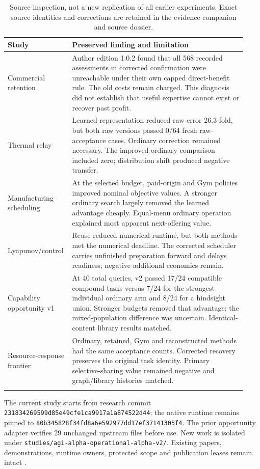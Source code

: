 \documentclass[11pt,letterpaper]{article}
\begin{document}
\begin{longtable}{@{}p{0.22\linewidth}p{0.71\linewidth}@{}}
\toprule Study & Preserved finding and limitation \\ \midrule\endhead
Commercial retention & Author edition 1.0.2 found that all 568 recorded assessments in corrected confirmation were unreachable under their own capped direct-benefit rule. The old costs remain charged. This diagnosis did not establish that useful expertise cannot exist or recover past profit. \\ 
Thermal relay & Learned representation reduced raw error 26.3-fold, but both raw versions passed 0/64 fresh raw-acceptance cases. Ordinary correction remained necessary. The improved ordinary comparison included zero; distribution shift produced negative transfer. \\
Manufacturing scheduling & At the selected budget, paid-origin and Gym policies improved nominal objective values. A stronger ordinary search largely removed the learned advantage cheaply. Equal-menu ordinary operation explained most apparent next-offering value. \\
Lyapunov/control & Reuse reduced numerical runtime, but both methods met the numerical deadline. The corrected scheduler carries unfinished preparation forward and delays readiness; negative additional economics remain. \\
Capability opportunity v1 & At 40 total queries, v2 passed 17/24 compatible compound tasks versus 7/24 for the strongest individual ordinary arm and 8/24 for a hindsight union. Stronger budgets removed that advantage; the mixed-population difference was uncertain. Identical-content library results matched. \\
Resource-response frontier & Ordinary, retained, Gym and reconstructed methods had the same acceptance counts. Corrected recovery preserves the original task identity. Primary selective-sharing value remained negative and graph/library histories matched. \\ \bottomrule
\caption{Source inspection, not a new replication of all earlier experiments. Exact source identities and corrections are retained in the evidence companion and source dossier.}
\end{longtable}

The current study starts from research commit \texttt{231834269599d85e49cfe1ca9917a1a874522d44}; the native runtime remains pinned to \texttt{80b345828f34fd8a6e592977dd17ef37141305f4}. The prior opportunity adapter verifies 29 unchanged upstream files before use. New work is isolated under \texttt{studies/agi-alpha-operational-alpha-v2/}. Existing papers, demonstrations, runtime owners, protected scope and publication leases remain intact \cite{prior,coordination}.
\end{document}
